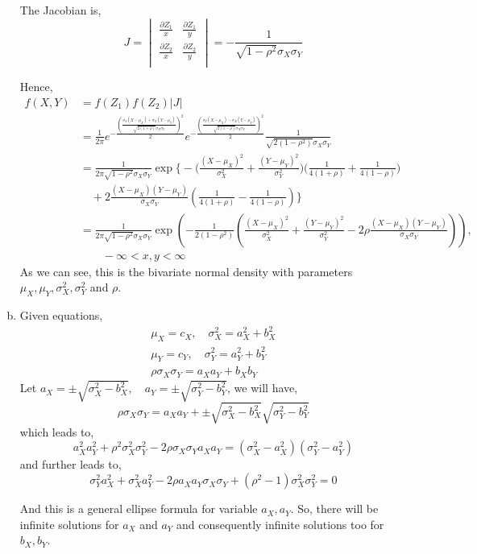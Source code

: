 \documentclass[letterpaper]{article}
\begin{document}
\begin{enumerate}[(a)]
    The Jacobian is,
    \[
    J = \begin{vmatrix}
    \frac{\partial Z_1}{x} & \frac{\partial Z_1}{y}\\
    \frac{\partial Z_2}{x} & \frac{\partial Z_2}{y}\\
    \end{vmatrix} = -\frac{1}{\sqrt{1-\rho^2} \sigma_X \sigma_Y}
    \]

    Hence,
    \begin{align*}
    f(X, Y) & = f(Z_1)f(Z_2) |J|\\
    & = \frac{1}{2\pi} e^{-\frac{\left(\frac{\sigma_Y(X-\mu_X) + \sigma_X(Y-\mu_Y)}{\sqrt{2(1+\rho)}\sigma_X \sigma_Y}\right)^2}{2}} e^{-\frac{\left(\frac{\sigma_Y(X-\mu_X) - \sigma_X(Y-\mu_Y)}{\sqrt{2(1-\rho)}\sigma_X \sigma_Y}\right)^2}{2}} \frac{1}{\sqrt{2(1-\rho^2)}\sigma_X \sigma_Y} \\
    & = \frac{1}{2\pi\sqrt{1-\rho^2}\sigma_X\sigma_Y} \exp\Big\{-\big(\frac{(X-\mu_X)^2}{\sigma_X^2} + \frac{(Y-\mu_Y)^2}{\sigma_Y^2} \big) \big(\frac{1}{4(1+\rho)} + \frac{1}{4(1-\rho)} \big) \\
    & \quad + 2\frac{(X-\mu_X)(Y-\mu_Y)}{\sigma_X\sigma_Y}\left(\frac{1}{4(1+\rho)} - \frac{1}{4(1-\rho)}\right)\Big\} \\
    & = \frac{1}{2\pi\sqrt{1-\rho^2}\sigma_X\sigma_Y} \exp\left(-\frac{1}{2(1-\rho^2)}\left(\frac{(X-\mu_X)^2}{\sigma_X^2} + \frac{(Y-\mu_Y)^2}{\sigma_Y^2} -2\rho \frac{(X-\mu_X)(Y- \mu_Y)}{\sigma_X\sigma_Y} \right)\right), \\
    & \qquad -\infty < x, y < \infty
    \end{align*}
    As we can see, this is the bivariate normal density with parameters $\mu_X, \mu_Y, \sigma_X^2, \sigma_Y^2$ and $\rho$.

    \item Given equations,
    \begin{align*}
    \mu_X = c_X, \quad \sigma_X^2 = a_X^2 + b_X^2\\
    \mu_Y = c_Y, \quad \sigma_Y^2 = a_Y^2 + b_Y^2\\
    \rho \sigma_X \sigma_Y = a_X a_Y + b_Xb_Y
    \end{align*}
    Let $a_X = \pm \sqrt{\sigma_X^2 - b_X^2}, \quad a_Y = \pm \sqrt{\sigma_Y^2 - b_Y^2}$, we will have,
    \[
    \rho \sigma_X \sigma_Y = a_X a_Y + \pm \sqrt{\sigma_X^2 - b_X^2}\sqrt{\sigma_Y^2 - b_Y^2}
    \]
    which leads to,
    \[
    a_X^2 a_Y^2 + \rho^2 \sigma_X^2 \sigma_Y^2 -2 \rho \sigma_X \sigma_Y a_X a_Y = (\sigma_X^2 - a_X^2)(\sigma_Y^2 - a_Y^2)
    \]
    and further leads to,
    \[
    \sigma_Y^2 a_X^2 + \sigma_X^2 a_Y^2 - 2\rho a_X a_Y \sigma_X \sigma_Y + (\rho^2 -1)\sigma_X^2 \sigma_Y^2  = 0
    \]

    And this is a general ellipse formula for variable $a_X, a_Y$. So, there will be infinite solutions for $a_X$ and $a_Y$ and consequently infinite solutions too for $b_X, b_Y$.
    \end{enumerate}
\end{document}

